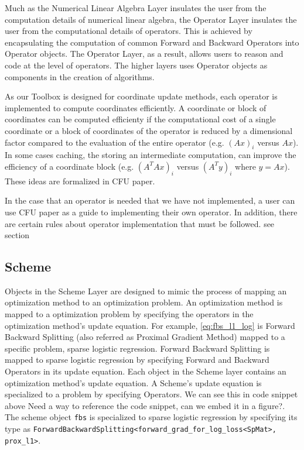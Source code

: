 Much as the Numerical Linear Algebra Layer insulates the user from the computation details of numerical linear algebra, the Operator Layer insulates the user from the computational details of operators. This is achieved by encapsulating the computation of common Forward and Backward Operators into Operator objects. The Operator Layer, as a result, allows users to reason and code at the level of operators. The higher layers uses Operator objects as components in the creation of algorithms.

As our Toolbox is designed for coordinate update methods, each operator is implemented to compute coordinates efficiently. A coordinate or block of coordinates can be computed efficienty if the computational cost of a single coordinate or a block of coordinates of the operator is reduced by a dimensional factor compared to the evaluation of the entire operator (e.g. $(Ax)_i$ versus $Ax$). In some cases caching, the storing an intermediate computation, can improve the efficiency of a coordinate block (e.g. $(A^TAx)_i$ versus $(A^Ty)_i$ where $y=Ax$). These ideas are formalized in CFU paper.  

In the case that an operator is needed that we have not implemented, a user can use CFU paper as a guide to  implementing their own operator. In addition, there are certain rules about operator implementation that must be followed. see section
 

\subsection{Scheme}

Objects in the Scheme Layer are designed to mimic the process of mapping an optimization method to an optimization problem.
An optimization method is mapped to a optimization problem by specifying the operators in the optimization method's update equation.
For example, \eqref{eq:fbs_l1_log} is Forward Backward Splitting (also referred as Proximal Gradient Method) mapped to a specific problem, sparse logistic regression.
Forward Backward Splitting is mapped to sparse logistic regression by specifying Forward and Backward Operators in its update equation.
Each object in the Scheme layer contains an optimization method's update equation.
A Scheme's update equation is specialized to a problem by specifying Operators. We can see this in code snippet above {\color{red} Need a way to reference the code snippet, can we embed it in a figure?}.
The scheme object \texttt{fbs} is specialized to sparse logistic regression by specifying its type as \texttt{ForwardBackwardSplitting<forward\_grad\_for\_log\_loss<SpMat>, prox\_l1>}.
  
